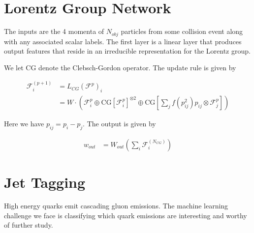 \documentclass[book.tex]{subfiles}
\begin{document}

\section{Lorentz Group Network}

The inputs are the 4 momenta of $N_{obj}$ particles from some collision event along with any associated scalar labels. The first layer is a linear layer that produces output features that reside in an irreducible representation for the Lorentz group. %

We let $\textrm{CG}$ denote the Clebsch-Gordon operator. The update rule is given by %

\begin{align}
\mathcal{F}_i^{(p+1)} &= L_{CG}(\mathcal{F}^p)_i \\
&= W \cdot \left ( \mathcal{F}^p_i \oplus \textrm{CG}[\mathcal{F}^p_i]^{\otimes 2} \oplus \textrm{CG}[ \sum_j f(p_{ij}^2)p_{ij} \otimes \mathcal{F}^p_j] \right ) 
\end{align}

Here we have $p_{ij} = p_i - p_j$. The output is given by

\begin{align}
    w_{out} &= W_{out} \left ( \sum_i \mathcal{F}_i^{(N_{CG})} \right )
\end{align}

\section{Jet Tagging}

High energy quarks emit cascading gluon emissions. The machine learning challenge we face is classifying which quark emissions are interesting and worthy of further study.
\end{document}
